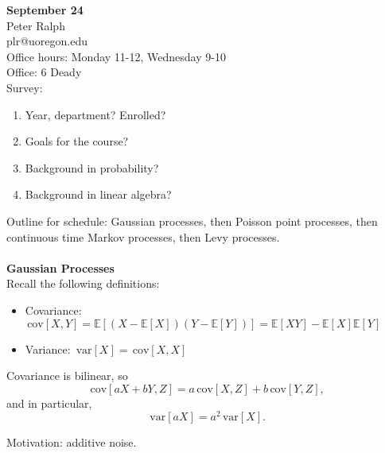 \documentclass{article}
\theoremstyle{definition}
\newcommand{\E}{\mathbb{E}}
\newcommand{\var}{\,\mathrm{var}}
\newcommand{\cov}{\,\mathrm{cov}}
\begin{document}
\textbf{\Large September 24}\\

\noindent Peter Ralph\\
plr@uoregon.edu\\
Office hours: Monday 11-12, Wednesday 9-10\\
Office: 6 Deady\\

\noindent Survey:
\begin{enumerate}
\item Year, department?  Enrolled?
\item Goals for the course?
\item Background in probability?
\item Background in linear algebra?\\
\end{enumerate}

Outline for schedule: Gaussian processes, then Poisson point processes, then continuous time Markov processes, then Levy processes.\\\\

\textbf{\Large Gaussian Processes}\\

Recall the following definitions:
\begin{itemize}

\item Covariance: $\cov[X,Y]=\E[(X-\E[X])(Y-\E[Y])]=\E[XY]-\E[X]\E[Y]$

\item Variance: $\var[X]=\cov[X,X]$

\end{itemize}

Covariance is bilinear, so \[\cov[aX+bY,Z]=a\cov[X,Z]+b\cov[Y,Z],\] and in particular, \[\var[aX]=a^2\var[X].\]

Motivation: additive noise.
\end{document}
